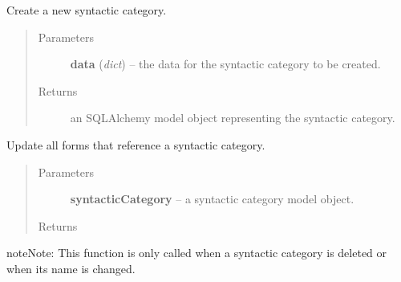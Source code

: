 \documentclass[letterpaper,10pt,english]{sphinxmanual}
\begin{document}
\begin{fulllineitems}
\label{api:onlinelinguisticdatabase.controllers.syntacticcategories.createNewSyntacticCategory}
Create a new syntactic category.
\begin{quote}\begin{description}
\item[{Parameters}] \leavevmode
\textbf{data} (\emph{dict}) -- the data for the syntactic category to be created.

\item[{Returns}] \leavevmode
an SQLAlchemy model object representing the syntactic category.

\end{description}\end{quote}

\end{fulllineitems}


\begin{fulllineitems}
\label{api:onlinelinguisticdatabase.controllers.syntacticcategories.updateFormsReferencingThisCategory}
Update all forms that reference a syntactic category.
\begin{quote}\begin{description}
\item[{Parameters}] \leavevmode
\textbf{syntacticCategory} -- a syntactic category model object.

\item[{Returns}] \leavevmode
{}

\end{description}\end{quote}

\begin{notice}{note}{Note:}
This function is only called when a syntactic category is deleted or
when its name is changed.
\end{notice}

\end{fulllineitems}

\end{document}
